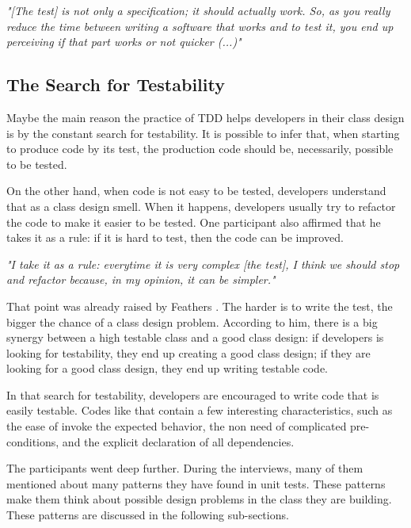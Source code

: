 \documentclass[times]{speauth}
\begin{document}
\begin{framed}
	\textit{"[The test] is not only a specification; it should actually work. So, as you really reduce
	the time between writing a software that works and to test it, you end up perceiving if that
	part works or not quicker (...)"}
\end{framed}

\subsection{The Search for Testability}

Maybe the main reason the practice of TDD helps developers in their class design is
by the constant search for testability. It is possible to infer that,
when starting to produce code by its test, the production code should be, necessarily,
possible to be tested.

On the other hand, when code is not easy to be tested, developers understand that
as a class design smell. When it happens, developers usually try to refactor
the code to make it easier to be tested. One participant also affirmed that he
takes it as a rule: if it is hard to test, then the code can be improved.

\begin{framed}
	\textit{"I take it as a rule: everytime it is very complex [the test],
	I think we should stop and refactor because, in my opinion, it can be simpler."}	
\end{framed}

That point was already raised by Feathers \cite{feathers-synergy}.
The harder is to write the test, the bigger the chance of a class design problem.
According to him, there is a big synergy between a high testable class and
a good class design: if developers is looking for testability, they end up
creating a good class design; if they are looking for a good class design, they end
up writing testable code.

In that search for testability, developers are encouraged to write code
that is easily testable. Codes like that contain a few interesting
characteristics, such as the ease of invoke the expected behavior,
the non need of complicated pre-conditions, and the explicit declaration
of all dependencies.

The participants went deep further. During the interviews, many of them
mentioned about many patterns they have found in unit tests. These patterns
make them think about possible design problems in the class they are building.
These patterns are discussed in the following sub-sections.
\end{document}
